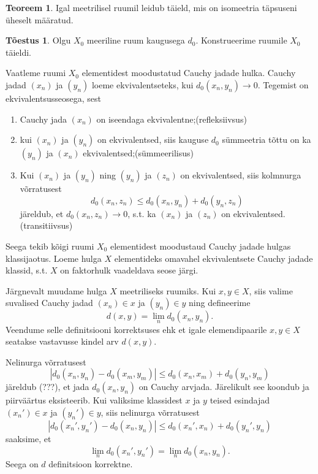 \documentclass{article}[12pt]
\theoremstyle{definition}
\theoremstyle{definition}
\newtheorem{theorem}{Teoreem}[section]
\theoremstyle{definition}
\theoremstyle{break}
\newtheorem*{toestus}{Tõestus}
\begin{document}
\begin{theorem}
	Igal meetrilisel ruumil leidub täield, mis on isomeetria täpsuseni üheselt määratud.
\end{theorem}
\begin{toestus}
	Olgu $X_0$ meeriline ruum kaugusega $d_0$. Konstrueerime ruumile $X_0$ täieldi.

	Vaatleme ruumi $X_0$ elementidest moodustatud Cauchy jadade hulka.
	Cauchy jadad $(x_n)$ ja $(y_n)$ loeme ekvivalentseteks, kui $d_0(x_n,y_n)\rightarrow 0$. Tegemist on ekvivalentsusseosega, sest
	\begin{enumerate}
		\item Cauchy jada $(x_n)$ on iseendaga ekvivalentne;\hfill (refleksiivsus)
		\item kui $(x_n)$ ja $(y_n)$ on ekvivalentsed, siis kauguse $d_0$ sümmeetria tõttu on ka $(y_n)$ ja $(x_n)$ ekvivalentsed;\hfill (sümmeerilisus)
		\item Kui $(x_n)$ ja $(y_n)$ ning $(y_n)$ ja $(z_n)$ on ekvivalentsed, siis kolmnurga võrratusest
		\[
			d_0(x_n,z_n) \leq d_0(x_n,y_n) + d_0(y_n,z_n)
		\]
		järeldub, et $d_0(x_n,z_n)\rightarrow 0$, s.t. ka $(x_n)$ ja $(z_n)$ on ekvivalentsed.\hfill (transitiivsus)
	\end{enumerate}

	Seega tekib kõigi ruumi $X_0$ elementidest moodustaud Cauchy jadade hulgas klassijaotus. Loeme hulga $X$ elementideks omavahel ekvivalentsete Cauchy jadade klassid, s.t. $X$ on faktorhulk vaadeldava seose järgi.

	Järgnevalt muudame hulga $X$ meetriliseks ruumiks. Kui $x,y\in X$, siis valime suvalised Cauchy jadad $(x_n)\in x$ ja $(y_n)\in y$ ning defineerime
	\[
		d(x,y) = \lim_n d_0(x_n,y_n).
	\]
	Veendume selle definitsiooni korrektsuses ehk et igale elemendipaarile $x,y\in X$ seatakse vastavusse kindel arv $d(x,y)$.

	Nelinurga võrratusest
	\[
		|d_0(x_n,y_n) - d_0(x_m,y_m)| \leq d_0(x_n,x_m) + d_0(y_n,y_m)
	\]
	järeldub (???), et jada $d_0(x_n,y_n)$ on Cauchy arvjada. Järelikult see koondub ja piirväärtus eksisteerib. Kui valiksime klassidest $x$ ja $y$ teised esindajad $(x_n')\in x$ ja $(y_n')\in y$, siis nelinurga võrratusest
	\[
		|d_0(x_n',y_n') - d_0(x_n,y_n)| \leq d_0(x_n',x_n) + d_0(y_n',y_n)
	\]
	saaksime, et
	\[
		\lim_n d_0(x_n',y_n') = \lim_n d_0(x_n,y_n).
	\]
	Seega on $d$ definitsioon korrektne.


\end{toestus}
\end{document}
